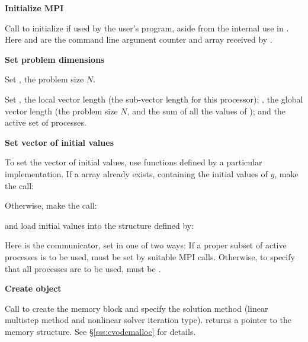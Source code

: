\begin{Steps}
  
\item 
  {\bf {\p} Initialize MPI}

  Call  to initialize {\mpi} if used by
  the user's program, aside from the internal use in {\nvecp}.  
  Here  and  are the command line argument 
  counter and array received by .
  
\item
  {\bf Set problem dimensions}

  {\s} Set , the problem size $N$.

  {\p} Set , the local vector length (the sub-vector
  length for this processor); , the global vector length (the
  problem size $N$, and the sum of all the values of );
  and the active set of processes.
  
\item
  {\bf Set vector of initial values}
 
  To set the vector  of initial values, use functions defined by a
  particular {\nvector} implementation.  If a  array  
  already exists, containing the initial values of $y$, make the call:

  {\s} 

  {\p} 

  Otherwise, make the call:

  {\s} 

  {\p} 

  and load initial values into the structure defined by:

  {\s} 

  {\p} 

  Here  is the {\mpi} communicator, set in one of two ways: 
  If a proper subset of active processes is to be used,  
  must be set by suitable MPI calls. Otherwise, to specify that all 
  processes are to be used,  must be .
  
\item\label{i:cvode_create} 
  {\bf Create {\cvode} object}

  Call  
  to create the {\cvode} memory block and specify the solution method
  (linear multistep method and nonlinear solver iteration type).
   returns a pointer to the {\cvode} memory structure.
  See \S\ref{sss:cvodemalloc} for details.


\end{Steps}
